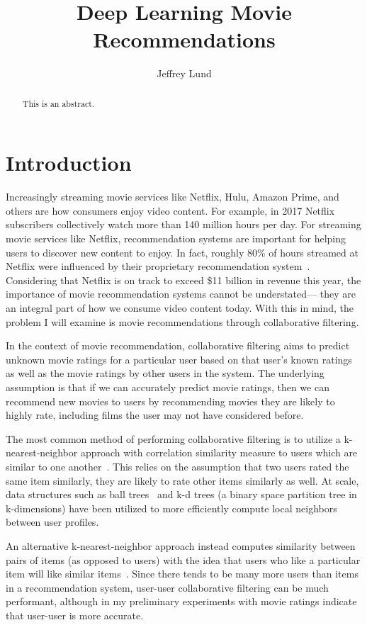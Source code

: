 \documentclass{sig-alternate-05-2015}
\begin{document}
\title{Deep Learning Movie Recommendations}
\author{Jeffrey Lund}
\date{}
\maketitle

\begin{abstract}
This is an abstract.
\end{abstract}

\section{Introduction}

Increasingly streaming movie services like Netflix, Hulu, Amazon Prime, and
others are how consumers enjoy video content.
For example, in 2017 Netflix subscribers collectively watch more than 140
million hours per day.
For streaming movie services like Netflix, recommendation systems are
important for helping users to discover new content to enjoy.
In fact, roughly 80\% of hours streamed at Netflix were influenced by their
proprietary recommendation system~\cite{netflix}.
Considering that Netflix is on track to exceed \$11 billion in revenue this
year, the importance of movie recommendation systems cannot be understated---
they are an integral part of how we consume video content today.
With this in mind, the problem I will examine is movie recommendations through
collaborative filtering.

In the context of movie recommendation, collaborative filtering aims to predict
unknown movie ratings for a particular user based on that user's known ratings
as well as the movie ratings by other users in the system.
The underlying assumption is that if we can accurately predict movie ratings,
then we can recommend new movies to users by recommending movies they are
likely to highly rate, including films the user may not have considered before.

The most common method of performing collaborative filtering is to utilize a
k-nearest-neighbor approach with correlation similarity measure to users which
are similar to one another~\cite{user-user}.
This relies on the assumption that two users rated the same item similarly,
they are likely to rate other items similarly as well.
At scale, data structures such as ball trees~\cite{ball-tree} and k-d trees (a
binary space partition tree in k-dimensions) have been utilized to more
efficiently compute local neighbors between user profiles.

An alternative k-nearest-neighbor approach instead computes similarity between
pairs of items (as opposed to users) with the idea that users who like a
particular item will like similar items~\cite{item-item}.
Since there tends to be many more users than items in a recommendation system,
user-user collaborative filtering can be much performant, although in my
preliminary experiments with movie ratings indicate that user-user is more
accurate.
\end{document}
